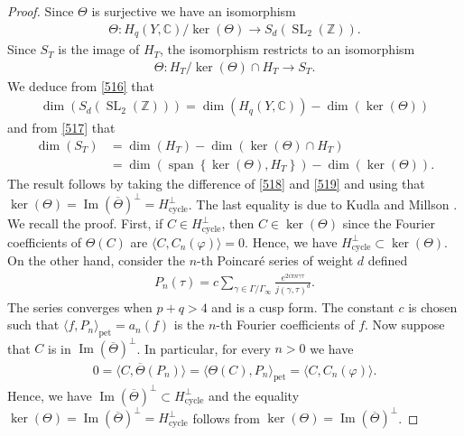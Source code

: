 \documentclass[11pt]{article} %
\newcommand{\8}{\infty}
\newcommand{\Z}{\mathbb{Z}}
\newcommand{\cycle}{\operatorname{cycle}}
\newcommand{\Span}{\operatorname{span}}
\newcommand{\SL}{\operatorname{SL}}
\newcommand{\C}{\mathbb{C}}
\newcommand{\im}{\operatorname{Im}}
\theoremstyle{mytheoremstyle}
\theoremstyle{remark}
\numberwithin{equation}{section}
\begin{document}
\begin{proof} Since $\Theta$ is surjective we have an isomorphism
\begin{align} \label{516}
    \Theta \colon H_q(Y,\C) / \ker (\Theta) \longrightarrow S_{d}(\SL_2(\Z)).
\end{align}
Since $S_T$ is the image of $H_T$, the isomorphism restricts to an isomorphism
\begin{align} \label{517}
    \Theta \colon H_T/\ker(\Theta) \cap H_T \longrightarrow S_T.
\end{align}
We deduce from \eqref{516} that
\begin{align} \label{519}
    \dim \left ( S_{d}(\SL_2(\Z)) \right ) = \dim \left ( H_q(Y,\C) \right ) - \dim (\ker (\Theta))
\end{align}
and from \eqref{517} that
\begin{align} \label{518}
    \dim \left ( S_T \right ) & = \dim \left ( H_T \right ) - \dim (\ker (\Theta) \cap H_T) \nonumber \\
   & =  \dim \left ( \Span \left \{ \ker (\Theta), H_T \right \} \right ) - \dim (\ker (\Theta)).
\end{align} The result follows by taking the difference of \eqref{518} and \eqref{519} and using that $\ker(\Theta)=\im(\overline{\Theta})^\perp=H_{\cycle}^\perp$.
The last equality is due to Kudla and Millson \cite[Theorem.~4.2]{kmcjm}. We recall the proof. First, if $C \in H_{\cycle}^\perp$, then $C \in \ker(\Theta)$ since the Fourier coefficients of $\Theta(C)$ are $\langle C,C_n(\varphi) \rangle=0$. Hence, we have $H_{\cycle}^\perp \subset \ker(\Theta)$.
On the other hand, consider the $n$-th Poincaré series of weight $d$ defined
\begin{align}
 P_n(\tau)=  c\sum_{\gamma \in \Gamma / \Gamma_{\8}} \frac{e^{2i\pi n \gamma \tau}}{j(\gamma,\tau)^{d}}.
\end{align}
The series converges when $p+q>4$ and is a cusp form. The constant $c$ is chosen such that $\langle f,P_n \rangle_{\operatorname{pet}}=a_n(f)$ is the $n$-th Fourier coefficients of $f$. Now suppose that $C$ is in $\im(\overline{\Theta})^\perp$. In particular, for every $n>0$ we have
\begin{align}
    0=\langle C,\overline{\Theta}(P_n) \rangle = \langle \Theta(C),P_n \rangle_{\operatorname{pet}}= \langle C,C_n(\varphi) \rangle.
\end{align}
Hence, we have $\im(\overline{\Theta})^\perp \subset H_{\cycle}^\perp$ and the equality $\ker(\Theta)=\im(\overline{\Theta})^\perp=H_{\cycle}^\perp$ follows from $\ker(\Theta)=\im(\overline{\Theta})^\perp$.
\end{proof}
\printbibliography
\end{document}

